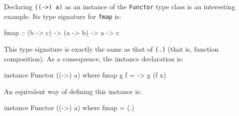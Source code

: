 \begin{example}[\texttt{((->) a)}]
  \label{ex:functors-haskell-function}
  Declaring \texttt{((->) a)} as an instance of the \texttt{Functor}
  type class is an interesting example. Its type signature for
  \texttt{fmap} is:
  \begin{codehaskell}
    fmap :: (b -> c) -> (a -> b) -> a -> c
  \end{codehaskell}
  This type signature is exactly the same as that of \texttt{(.)}
  (that is, function composition). As a consequence, the instance
  declaration is:
  \begin{codehaskell}
    instance Functor ((->) a) where
      fmap g f = \x -> g (f x)
  \end{codehaskell}
  An equivalent way of defining this instance is:
  \begin{codehaskell}
    instance Functor ((->) a) where
      fmap = (.)
  \end{codehaskell}






\end{example}
